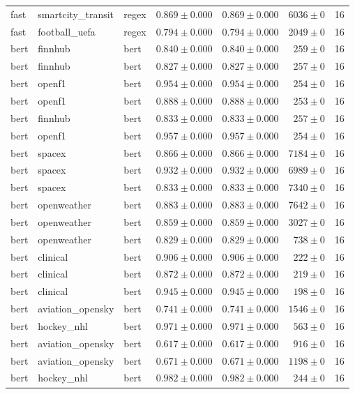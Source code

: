 \begin{table}[htbp]
\begin{tabular}{l l l r r r r}
fast & smartcity\_transit & regex & $0.869\pm0.000$ & $0.869\pm0.000$ & $6036\pm0$ & 16 \\
fast & football\_uefa & regex & $0.794\pm0.000$ & $0.794\pm0.000$ & $2049\pm0$ & 16 \\
bert & finnhub & bert & $0.840\pm0.000$ & $0.840\pm0.000$ & $259\pm0$ & 16 \\
bert & finnhub & bert & $0.827\pm0.000$ & $0.827\pm0.000$ & $257\pm0$ & 16 \\
bert & openf1 & bert & $0.954\pm0.000$ & $0.954\pm0.000$ & $254\pm0$ & 16 \\
bert & openf1 & bert & $0.888\pm0.000$ & $0.888\pm0.000$ & $253\pm0$ & 16 \\
bert & finnhub & bert & $0.833\pm0.000$ & $0.833\pm0.000$ & $257\pm0$ & 16 \\
bert & openf1 & bert & $0.957\pm0.000$ & $0.957\pm0.000$ & $254\pm0$ & 16 \\
bert & spacex & bert & $0.866\pm0.000$ & $0.866\pm0.000$ & $7184\pm0$ & 16 \\
bert & spacex & bert & $0.932\pm0.000$ & $0.932\pm0.000$ & $6989\pm0$ & 16 \\
bert & spacex & bert & $0.833\pm0.000$ & $0.833\pm0.000$ & $7340\pm0$ & 16 \\
bert & openweather & bert & $0.883\pm0.000$ & $0.883\pm0.000$ & $7642\pm0$ & 16 \\
bert & openweather & bert & $0.859\pm0.000$ & $0.859\pm0.000$ & $3027\pm0$ & 16 \\
bert & openweather & bert & $0.829\pm0.000$ & $0.829\pm0.000$ & $738\pm0$ & 16 \\
bert & clinical & bert & $0.906\pm0.000$ & $0.906\pm0.000$ & $222\pm0$ & 16 \\
bert & clinical & bert & $0.872\pm0.000$ & $0.872\pm0.000$ & $219\pm0$ & 16 \\
bert & clinical & bert & $0.945\pm0.000$ & $0.945\pm0.000$ & $198\pm0$ & 16 \\
bert & aviation\_opensky & bert & $0.741\pm0.000$ & $0.741\pm0.000$ & $1546\pm0$ & 16 \\
bert & hockey\_nhl & bert & $0.971\pm0.000$ & $0.971\pm0.000$ & $563\pm0$ & 16 \\
bert & aviation\_opensky & bert & $0.617\pm0.000$ & $0.617\pm0.000$ & $916\pm0$ & 16 \\
bert & aviation\_opensky & bert & $0.671\pm0.000$ & $0.671\pm0.000$ & $1198\pm0$ & 16 \\
bert & hockey\_nhl & bert & $0.982\pm0.000$ & $0.982\pm0.000$ & $244\pm0$ & 16 \\

\end{tabular}
\end{table}
